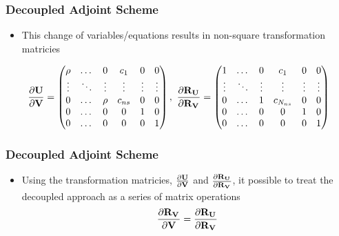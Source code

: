 \documentclass{beamer}
\begin{document}
\begin{frame}
  \frametitle{Decoupled Adjoint Scheme}
  \begin{itemize}
    \item This change of variables/equations results in non-square transformation
      matricies
  \end{itemize}
  \vspace{0.5cm}
\begin{equation*}
  \pd{\mU}{\mv} = 
  \begin{pmatrix}
    \rho   & \dots  & 0      & c_1     & 0      & 0      \\
    \vdots & \ddots & \vdots & \vdots  & \vdots & \vdots \\
    0      & \dots  &\rho    & c_{ns}  & 0      & 0      \\
    0      & \dots  &0       & 0       & 1      & 0      \\
    0      & \dots  &0       & 0       & 0      & 1
  \end{pmatrix}, \ 
  \pd{\ru{}}{\rv{}} =
  \begin{pmatrix}
    1      & \dots  & 0 & c_1        & 0 & 0 \\
    \vdots & \ddots & \vdots            & \vdots & \vdots & \vdots \\
    0      & \dots  & 1 & c_{N_{ns}} & 0 & 0 \\
    0      & \dots  & 0 & 0          & 1 & 0 \\
    0      & \dots  & 0 & 0          & 0 & 1 \\
  \end{pmatrix}
\end{equation*}
\end{frame}
\begin{frame}
  \frametitle{Decoupled Adjoint Scheme}
  \begin{itemize}
    \item Using the transformation matricies, $\frac{\partial \mathbf U}{\partial \mathbf V}$ and
      $\frac{\partial \mathbf R_{{\mathbf U}_{}}}{\partial \mathbf R_{{\mathbf V}_{}}}$, it possible to treat the decoupled approach as a
      series of matrix operations
      \begin{equation*}
        \frac{\partial \mathbf R_{{\mathbf V}_{}}}{\partial \mathbf V} = \frac{\partial \mathbf R_{{\mathbf U}_{}}}{\partial \mathbf R_{{\mathbf V}_{}}} 
      \end{equation*}
  \end{itemize}
\end{frame}
\end{document}
